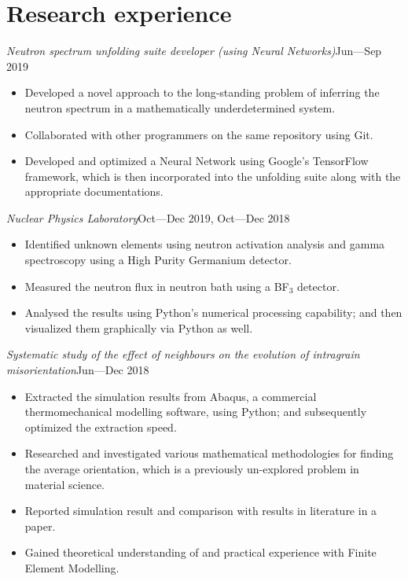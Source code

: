 \documentclass[a4paper, 12pt]{article}
\newcommand{\expentry}[3]{\emph{#1}\hfill{#2}---{#3}}
\begin{document}
\section{Research experience}
\expentry{Neutron spectrum unfolding suite developer (using Neural Networks)}{Jun}{Sep 2019}
    \begin{itemize}
    \setlength\itemsep{0em}
    \item Developed a novel approach to the long-standing problem of inferring the neutron spectrum in a mathematically underdetermined system.
    \item Collaborated with other programmers on the same repository using Git.
    \item Developed and optimized a Neural Network using Google's TensorFlow framework, which is then incorporated into the unfolding suite along with the appropriate documentations.
    \end{itemize}
\expentry{Nuclear Physics Laboratory}{Oct}{Dec 2019, Oct---Dec 2018}
    \begin{itemize}
    \setlength\itemsep{0em}
    \item Identified unknown elements using neutron activation analysis and gamma spectroscopy using a High Purity Germanium detector.
    \item Measured the neutron flux in neutron bath using a BF$_3$ detector.
    \item Analysed the results using Python’s numerical processing capability; and then visualized them graphically via Python as well.
    \end{itemize}
\begin{adjustwidth}{-0.5cm}{-1.2cm} %
\expentry{Systematic study of the effect of neighbours on the evolution of intragrain misorientation}{Jun}{Dec 2018}
\end{adjustwidth}
    \begin{itemize}
    \setlength\itemsep{0em}
    \item Extracted the simulation results from Abaqus, a commercial thermomechanical modelling software, using Python; and subsequently optimized the extraction speed.
    \item Researched and investigated various mathematical methodologies for finding the average orientation, which is a previously un-explored problem in material science.
    \item Reported simulation result and comparison with results in literature in a paper.
    \item Gained theoretical understanding of and practical experience with Finite Element Modelling.
    \end{itemize}
\end{document}
